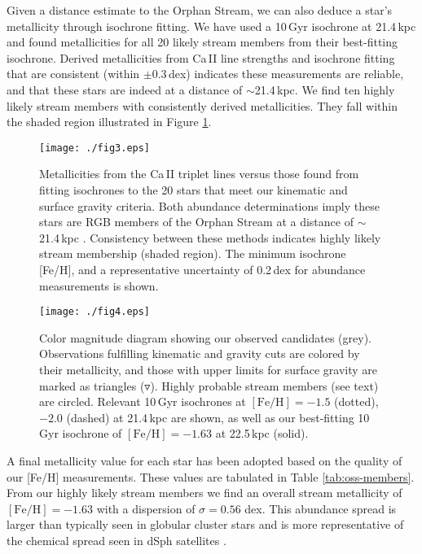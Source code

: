 \documentclass[10pt,apjl]{emulateapj}
\begin{document}
Given a distance estimate to the Orphan Stream, we can also deduce a star's metallicity through isochrone fitting. We have used a 10\,Gyr \citet{Girardi_et-al_2008} isochrone at 21.4\,kpc \citep{Newberg_et-al_2010} and found metallicities for all 20 likely stream members from their best-fitting isochrone. Derived metallicities from Ca\,\textsc{II} line strengths and isochrone fitting that are consistent (within $\pm0.3$\,dex) indicates these measurements are reliable, and that these stars are indeed at a distance of $\sim$21.4\,kpc. We find ten highly likely stream members with consistently derived metallicities. They fall within the shaded region illustrated in Figure \ref{fig:feh}. 

\begin{figure}[t!]
	\texttt{[image: ./fig3.eps]}
	\caption{Metallicities from the Ca\,\textsc{II} triplet lines versus those found from fitting isochrones to the 20 stars that meet our kinematic and surface gravity criteria. Both abundance determinations imply these stars are RGB members of the Orphan Stream at a distance of $\sim$21.4\,kpc \citep{Newberg_et-al_2010}. Consistency between these methods indicates highly likely stream membership (shaded region). The minimum isochrone [Fe/H], and a representative uncertainty of 0.2\,dex for abundance measurements is shown.}
	\label{fig:feh}
\end{figure}

\begin{figure}[t!]
	\texttt{[image: ./fig4.eps]}
	\caption{Color magnitude diagram showing our observed candidates (grey). Observations fulfilling kinematic and gravity cuts are colored by their metallicity, and those with upper limits for surface gravity are marked as triangles ($\triangledown$). Highly probable stream members (see text) are circled. Relevant 10\,Gyr \citet{Girardi_et-al_2008} isochrones at $[\mbox{Fe/H}] = -1.5$ (dotted), $-2.0$ (dashed) at 21.4\,kpc \citep{Newberg_et-al_2010} are shown, as well as our best-fitting 10\,Gyr isochrone of $[\mbox{Fe/H}] = -1.63$ at 22.5\,kpc (solid).}
	\label{fig:cmd}
\end{figure}

A final metallicity value for each star has been adopted based on the quality of our [Fe/H] measurements. These values are tabulated in Table \ref{tab:oss-members}. From our highly likely stream members we find an overall stream metallicity of $[\mbox{Fe/H}] = -1.63$ with a dispersion of $\sigma = 0.56$ dex. This abundance spread is larger than typically seen in globular cluster stars and is more representative of the chemical spread seen in dSph satellites \citep[e.g.,][]{Frebel_Norris_2011}.
\end{document}
